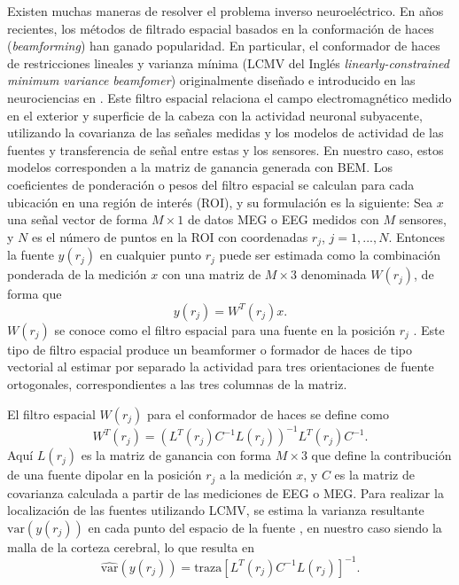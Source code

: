 Existen muchas maneras de resolver el problema inverso neuroeléctrico. En años recientes, los métodos de filtrado espacial basados en la conformación de haces (\emph{beamforming}) han ganado popularidad.
En particular, el conformador de haces de restricciones lineales y varianza mínima (LCMV del Inglés \emph{linearly-constrained minimum variance beamfomer}) originalmente diseñado e introducido en las neurociencias en \cite{VanVeen1988, VanVeen1997}.
Este filtro espacial relaciona el campo electromagnético medido en el exterior y superficie de la cabeza con la actividad neuronal subyacente, utilizando la covarianza de las señales medidas y los modelos de actividad de las fuentes y transferencia de señal entre estas y los sensores. En nuestro caso, estos modelos corresponden a la matriz de ganancia generada con BEM.
Los coeficientes de ponderación o pesos del filtro espacial se calculan para cada ubicación en una región de interés (ROI), y su formulación es la siguiente: \linebreak Sea $x$ una señal vector de forma $M \times 1$ de datos MEG o EEG medidos con $M$ sensores, y $N$ es el número de puntos en la ROI con coordenadas $r_j$, $j = 1, ..., N$.
Entonces la fuente $y(r_j)$ en cualquier punto $r_j$ puede ser estimada como la combinación ponderada de la medición $x$ con una matriz de $M \times 3$ denominada $W(r_j)$, de forma que
\begin{equation}
	\label{beamformer}
	y(r_j) = W^{T}(r_j)x \text{.}
\end{equation}
$W(r_j)$ se conoce como el filtro espacial para una fuente en la posición $r_j$ \cite{VanVeen1997,Jaiswal2020}.
Este tipo de filtro espacial produce un beamformer o formador de haces de tipo vectorial al estimar por separado la actividad para tres orientaciones de fuente ortogonales, correspondientes a las tres columnas de la matriz.

El filtro espacial $W(r_j)$ para el conformador de haces se define como
\begin{equation}
	\label{beamformer2}
	W^{T}(r_j) = (L^{T}(r_j)C^{-1}L(r_j))^{-1}L^{T}(r_j)C^{-1} \text{.}
\end{equation}
Aquí $L(r_j)$ es la matriz de ganancia con forma $M \times 3$ que define la contribución de una fuente dipolar en la posición $r_j$ a la medición $x$, y $C$ es la matriz de covarianza calculada a partir de las mediciones de EEG o MEG.
Para realizar la localización de las fuentes utilizando LCMV, se estima la varianza resultante $\text{var}(y(r_j))$ en cada punto del espacio de la fuente \cite{VanVeen1997,Jaiswal2020}, en nuestro caso siendo la malla de la corteza cerebral, lo que resulta en
\begin{equation}
	\label{beamformer3}
	\widehat{\text{var}}(y(r_j)) = \text{traza}[L^{T}(r_j)C^{-1}L(r_j)]^{-1}.
\end{equation}

